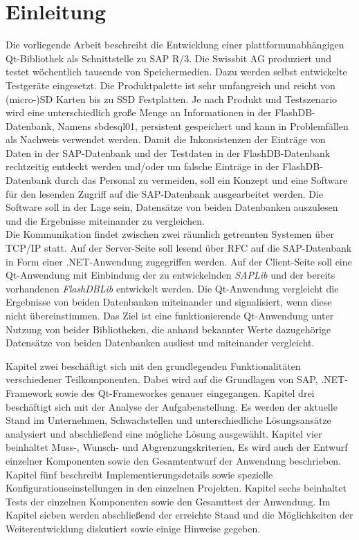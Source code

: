 \chapter{Einleitung}



	\vspace{20mm}	
	
	
	Die vorliegende Arbeit beschreibt die Entwicklung einer plattformunabhängigen Qt-Bibliothek als Schnittstelle zu SAP R/3. Die Swissbit AG produziert und testet wöchentlich tausende von Speichermedien. Dazu werden selbst entwickelte Testgeräte eingesetzt. Die Produktpalette ist sehr umfangreich und reicht von (micro-)SD Karten bis zu SSD Festplatten. Je nach Produkt und Testszenario wird eine unterschiedlich große Menge an Informationen in der FlashDB-Datenbank, Namens sbdesql01, persistent gespeichert und kann in Problemfällen als Nachweis verwendet werden. Damit die Inkonsistenzen der Einträge von Daten in der SAP-Datenbank und der Testdaten in der FlashDB-Datenbank rechtzeitig entdeckt werden und/oder um falsche Einträge in der FlashDB-Datenbank durch das Personal zu vermeiden, soll ein Konzept und eine Software für den lesenden Zugriff auf die SAP-Datenbank ausgearbeitet werden. Die Software soll in der Lage sein, Datensätze von beiden Datenbanken auszulesen und die Ergebnisse miteinander zu vergleichen. \\
	Die Kommunikation findet zwischen zwei räumlich getrennten Systemen über TCP/IP statt. Auf der Server-Seite soll lesend über RFC auf die SAP-Datenbank in Form einer .NET-Anwendung zugegriffen werden. Auf der Client-Seite soll eine Qt-Anwendung mit Einbindung der zu entwickelnden \textit{SAPLib} und der bereits vorhandenen \textit{FlashDBLib} entwickelt werden. Die Qt-Anwendung vergleicht die Ergebnisse von beiden Datenbanken miteinander und signalisiert, wenn diese nicht übereinstimmen. Das Ziel ist eine funktionierende Qt-Anwendung unter Nutzung von beider Bibliotheken, die anhand bekannter Werte dazugehörige Datensätze von beiden Datenbanken ausliest und miteinander vergleicht.
	
	
	
	Kapitel zwei beschäftigt sich mit den grundlegenden Funktionalitäten verschiedener Teilkomponenten. Dabei wird auf die Grundlagen von SAP, .NET-Framework sowie des  Qt-Frameworkes genauer eingegangen. Kapitel drei beschäftigt sich mit der Analyse der Aufgabenstellung. Es werden der aktuelle Stand im Unternehmen, Schwachstellen und unterschiedliche Lösungsansätze analysiert und abschließend eine mögliche Lösung ausgewählt. Kapitel vier beinhaltet Muss-, Wunsch- und Abgrenzungskriterien. Es wird auch der Entwurf einzelner Komponenten sowie den Gesamtentwurf der Anwendung beschrieben. Kapitel fünf beschreibt Implementierungsdetails sowie spezielle Konfigurationseinstellungen in den einzelnen Projekten. Kapitel sechs beinhaltet Tests der einzelnen Komponenten sowie den Gesamttest der Anwendung. Im Kapitel sieben werden abschließend der erreichte Stand und die Möglichkeiten der Weiterentwicklung diskutiert sowie einige Hinweise gegeben.